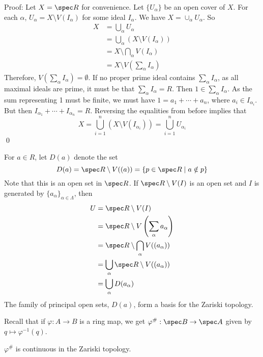 \noindent Proof: Let $X=\spec R$ for convenience. Let $\{U_\alpha\}$ be an open cover of $X$. For each $\alpha$, $U_\alpha=X \setminus V(I_\alpha)$ for some ideal $I_\alpha$. We have $X=\cup_\alpha U_\alpha$. So
\[
\begin{split}
X&=\bigcup_{\alpha} U_\alpha \\
&=\bigcup_{\alpha} (X \setminus V(I_\alpha)) \\
&=X \setminus \bigcap_{\alpha} V(I_\alpha) \\
&=X \setminus V\left(\sum_\alpha I_\alpha \right)
\end{split}
\]
Therefore, $V\left(\sum_{\alpha} I_\alpha \right)=\emptyset$. If no proper prime ideal contains $\sum_{\alpha} I_\alpha $, as all maximal ideals are prime, it must be that $\sum_{\alpha} I_\alpha =R$. Then $1 \in \sum_{\alpha} I_\alpha $. As the sum representing 1 must be finite, we must have $1=a_1+\cdots+a_n$, where $a_i \in I_{\alpha_i}$. But then $I_{\alpha_1}+\cdots+I_{\alpha_n}=R$. Reversing the equalities from before implies that
\[
X= \bigcup_{i=1}^n (X \setminus V(I_{\alpha_i}))= \bigcup_{i=1}^n U_{\alpha_i}
\]
\qed \\

\begin{dfn}
For $a \in R$, let $D(a)$ denote the set
\[
D(a)=\spec R \setminus V((a))= \{p \in \spec R\;|\; a \notin p\}
\]
Note that this is an open set in $\spec R$. If $\spec R \setminus V(I)$ is an open set and $I$ is generated by $\{a_\alpha\}_{\alpha \in \Lambda}$, then
\[
\begin{split}
U&= \spec R \setminus V(I) \\
&= \spec R \setminus V\left(\sum_\alpha a_\alpha \right) \\
&=\spec R \setminus \bigcap_\alpha V((a_\alpha)) \\
&=\bigcup_\alpha \spec R \setminus V((a_\alpha)) \\
&=\bigcup_\alpha D(a_\alpha)
\end{split}
\]
The family of principal open sets, $D(a)$, form a basis for the Zariski topology. 
\end{dfn}

Recall that if $\varphi: A \to B$ is a ring map, we get $\varphi^{\#}: \spec B \to \spec A$ given by $q \mapsto \varphi^{-1}(q)$. 

\begin{prop}
$\varphi^{\#}$ is continuous in the Zariski topology. 
\end{prop}


